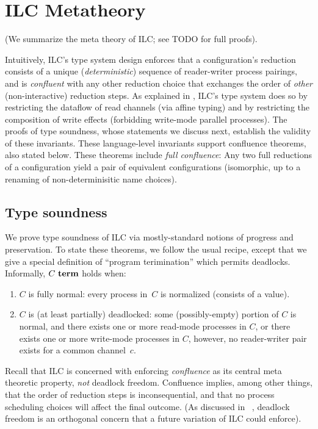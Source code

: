\section{ILC Metatheory}
\label{sec:metatheory}

(We summarize the meta theory of ILC; see TODO for full proofs).

Intuitively, ILC's type system design enforces that a
configuration's reduction consists of a unique
(\emph{deterministic}) sequence of reader-writer process pairings,
and is \emph{confluent} with any other reduction choice that exchanges 
the order of \emph{other} (non-interactive) reduction steps.
%
As explained in , 
ILC's type system does so by restricting the dataflow of read channels
(via affine typing) 
and by restricting the composition of write effects 
(forbidding write-mode parallel processes).
%
The proofs of type soundness, whose statements we discuss next, 
establish the validity of these invariants.
%
These language-level invariants support confluence theorems, also
stated below.
%
These theorems include \emph{full confluence}:
Any two full reductions of a configuration yield a pair of equivalent configurations
(isomorphic, up to a renaming of non-determinisitic name choices).

\subsection{Type soundness}

We prove type soundness of ILC via mostly-standard notions of progress
and preservation.
%
To state these theorems, we follow the usual recipe, except that we
give a special definition of ``program terimination'' which permits
deadlocks.
%
Informally, $C~\textbf{term}$ holds when:
\begin{enumerate}
 \item $C$ is fully normal: every process in~$C$  
   is normalized (consists of a value).
 \item $C$ is (at least partially) deadlocked: 
   some (possibly-empty) portion of $C$ is normal, and
   there exists one or more read-mode processes in $C$, or
   there exists one or more write-mode processes in $C$,
   however, no reader-writer pair exists for a common channel~$c$.
\end{enumerate}

Recall that ILC is concerned with enforcing \emph{confluence} as its
central meta theoretic property, \emph{not} deadlock freedom.
%
Confluence implies, among other things, that the order of reduction steps is
inconsequential, and that no process scheduling choices will affect
the final outcome.
%
(As discussed in ~, deadlock freedom is an
orthogonal concern that a future variation of ILC could enforce).

